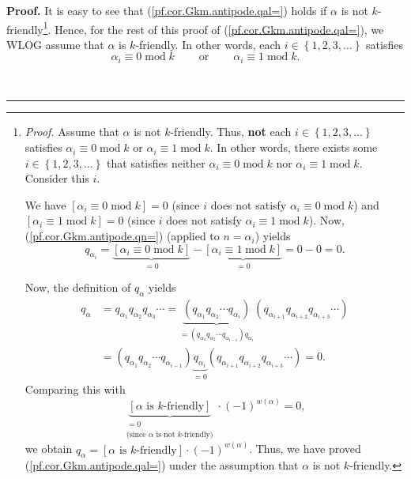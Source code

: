 \documentclass[numbers=enddot,12pt,final,onecolumn,notitlepage]{scrartcl}%
\theoremstyle{definition}
\newenvironment{proof}[1][Proof]{\noindent\textbf{#1.} }{\ \rule{0.5em}{0.5em}}
\newenvironment{verlong}{}{}
\begin{document}
\begin{proof}
\begin{verlong}
It is easy to see that (\ref{pf.cor.Gkm.antipode.qal=}) holds if $\alpha$ is
not $k$-friendly\footnote{\textit{Proof.} Assume that $\alpha$ is not
$k$-friendly. Thus, \textbf{not} each $i\in\left\{  1,2,3,\ldots\right\}  $
satisfies $\alpha_{i}\equiv0\operatorname{mod}k$ or $\alpha_{i}\equiv
1\operatorname{mod}k$. In other words, there exists some $i\in\left\{
1,2,3,\ldots\right\}  $ that satisfies neither $\alpha_{i}\equiv
0\operatorname{mod}k$ nor $\alpha_{i}\equiv1\operatorname{mod}k$. Consider
this $i$.
\par
We have $\left[  \alpha_{i}\equiv0\operatorname{mod}k\right]  =0$ (since $i$
does not satisfy $\alpha_{i}\equiv0\operatorname{mod}k$) and $\left[
\alpha_{i}\equiv1\operatorname{mod}k\right]  =0$ (since $i$ does not satisfy
$\alpha_{i}\equiv1\operatorname{mod}k$). Now, (\ref{pf.cor.Gkm.antipode.qn=})
(applied to $n=\alpha_{i}$) yields%
\[
q_{\alpha_{i}}=\underbrace{\left[  \alpha_{i}\equiv0\operatorname{mod}%
k\right]  }_{=0}-\underbrace{\left[  \alpha_{i}\equiv1\operatorname{mod}%
k\right]  }_{=0}=0-0=0.
\]
\par
Now, the definition of $q_{\alpha}$ yields%
\begin{align*}
q_{\alpha}  &  =q_{\alpha_{1}}q_{\alpha_{2}}q_{\alpha_{3}}\cdots
=\underbrace{\left(  q_{\alpha_{1}}q_{\alpha_{2}}\cdots q_{\alpha_{i}}\right)
}_{=\left(  q_{\alpha_{1}}q_{\alpha_{2}}\cdots q_{\alpha_{i-1}}\right)
q_{\alpha_{i}}}\left(  q_{\alpha_{i+1}}q_{\alpha_{i+2}}q_{\alpha_{i+3}}%
\cdots\right) \\
&  =\left(  q_{\alpha_{1}}q_{\alpha_{2}}\cdots q_{\alpha_{i-1}}\right)
\underbrace{q_{\alpha_{i}}}_{=0}\left(  q_{\alpha_{i+1}}q_{\alpha_{i+2}%
}q_{\alpha_{i+3}}\cdots\right)  =0.
\end{align*}
Comparing this with%
\[
\underbrace{\left[  \alpha\text{ is }k\text{-friendly}\right]  }%
_{\substack{=0\\\text{(since }\alpha\text{ is not }k\text{-friendly)}}%
}\cdot\left(  -1\right)  ^{w\left(  \alpha\right)  }=0,
\]
we obtain $q_{\alpha}=\left[  \alpha\text{ is }k\text{-friendly}\right]
\cdot\left(  -1\right)  ^{w\left(  \alpha\right)  }$. Thus, we have proved
(\ref{pf.cor.Gkm.antipode.qal=}) under the assumption that $\alpha$ is not
$k$-friendly.}. Hence, for the rest of this proof of
(\ref{pf.cor.Gkm.antipode.qal=}), we WLOG assume that $\alpha$ is
$k$-friendly. In other words, each $i\in\left\{  1,2,3,\ldots\right\}  $
satisfies%
\begin{equation}
\alpha_{i}\equiv0\operatorname{mod}k\ \ \ \ \ \ \ \ \ \ \text{or}%
\ \ \ \ \ \ \ \ \ \ \alpha_{i}\equiv1\operatorname{mod}k.
\label{pf.cor.Gkm.antipode.qal=.pf.friend}%
\end{equation}



\end{verlong}
\end{proof}
\end{document}
